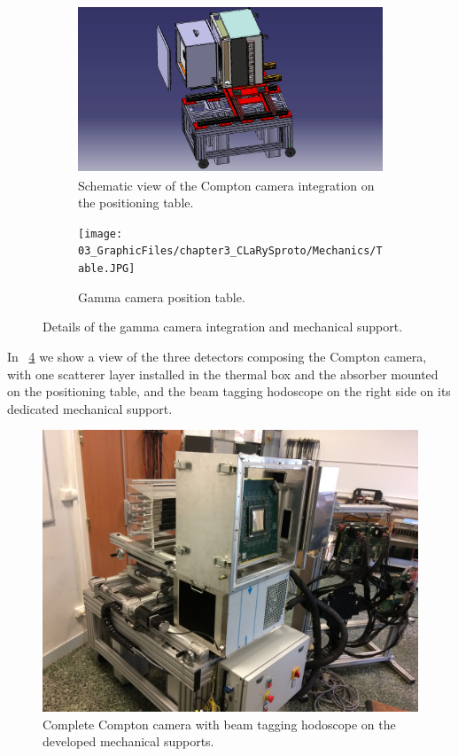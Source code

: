 \begin{figure}
\begin{subfigure}[t]{.5\textwidth}
\centering
\includegraphics[width=1\textwidth, trim= {1cm 0 1cm 0}, clip = true, height=5cm]{03_GraphicFiles/chapter3_CLaRySproto/Mechanics/TableCameraSchemeBlue.jpg}
\caption{Schematic view of the Compton camera integration on the positioning table.}
\label{chap3::fig::schemeTable}
\end{subfigure}
\begin{subfigure}[t]{.5\textwidth}
\centering
\texttt{[image: 03\_GraphicFiles/chapter3\_CLaRySproto/Mechanics/Table.JPG]}
\caption{Gamma camera position table.}
\label{chap3::fig::pictureTable}
\end{subfigure}
\caption{Details of the gamma camera integration and mechanical support.}
\label{chap3::fig::CameraIntegration}
\end{figure}

In \figurename~\ref{chap3::fig::cameraAllPicture} we show a view of the three detectors composing the Compton camera, with one scatterer layer installed in the thermal box and the absorber mounted on the positioning table, and the beam tagging hodoscope on the right side on its dedicated mechanical support.\\

\begin{figure}[!htbp]
\centering
\includegraphics[width=\textwidth]{03_GraphicFiles/chapter3_CLaRySproto/camera_complete.JPG}
\caption{Complete Compton camera with beam tagging hodoscope on the developed mechanical supports.}
\label{chap3::fig::cameraAllPicture}
\end{figure}

